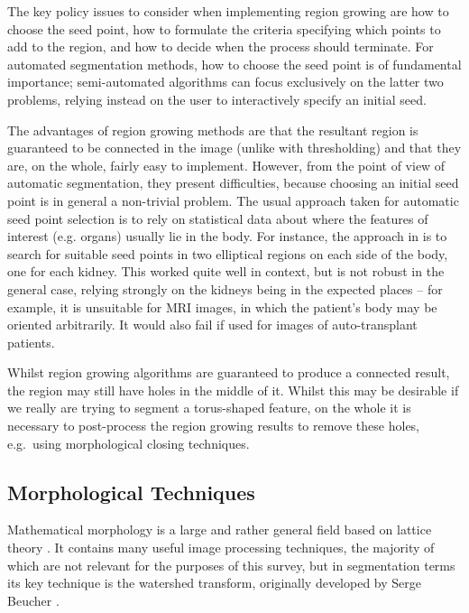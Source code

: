 
The key policy issues to consider when implementing region growing are how to choose the seed point, how to formulate the criteria specifying which points to add to the region, and how to decide when the process should terminate. For automated segmentation methods, how to choose the seed point is of fundamental importance; semi-automated algorithms can focus exclusively on the latter two problems, relying instead on the user to interactively specify an initial seed.

The advantages of region growing methods are that the resultant region is guaranteed to be connected in the image (unlike with thresholding) and that they are, on the whole, fairly easy to implement. However, from the point of view of automatic segmentation, they present difficulties, because choosing an initial seed point is in general a non-trivial problem. The usual approach taken for automatic seed point selection is to rely on statistical data about where the features of interest (e.g. organs) usually lie in the body. For instance, the approach in \cite{lin06} is to search for suitable seed points in two elliptical regions on each side of the body, one for each kidney. This worked quite well in context, but is not robust in the general case, relying strongly on the kidneys being in the expected places -- for example, it is unsuitable for MRI images, in which the patient's body may be oriented arbitrarily. It would also fail if used for images of auto-transplant patients.

Whilst region growing algorithms are guaranteed to produce a connected result, the region may still have holes in the middle of it. Whilst this may be desirable if we really are trying to segment a torus-shaped feature, on the whole it is necessary to post-process the region growing results to remove these holes, e.g.~using morphological closing techniques.

\subsection{Morphological Techniques}

Mathematical morphology is a large and rather general field based on lattice theory \cite{?}. It contains many useful image processing techniques, the majority of which are not relevant for the purposes of this survey, but in segmentation terms its key technique is the watershed transform, originally developed by Serge Beucher \cite{beucher90}.

